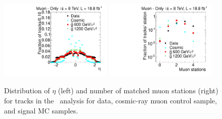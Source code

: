 \begin{figure}
\centering
  \includegraphics[clip=false, trim=0.0cm 0cm 0.0cm 0cm, width=0.48\textwidth]{figures/muonly/Selection_Comp_8TeV_Cosmic_Eta_BS}
  \includegraphics[clip=false, trim=0.0cm 0cm 0.0cm 0cm, width=0.48\textwidth]{figures/muonly/Selection_Comp_8TeV_Cosmic_MatchedStations_BS} \\
\caption[Distribution of $\eta$ and number of matched muon stations for data, cosmic-ray muon control sample, and signal MC samples in the \muononly\ analysis.]
{Distribution of $\eta$ (left) and number of matched muon stations (right) for tracks in the \muononly\ analysis
for data, cosmic-ray muon control sample, and signal MC samples.}
    \label{fig:MuOnlyPreselA}
\end{figure}

